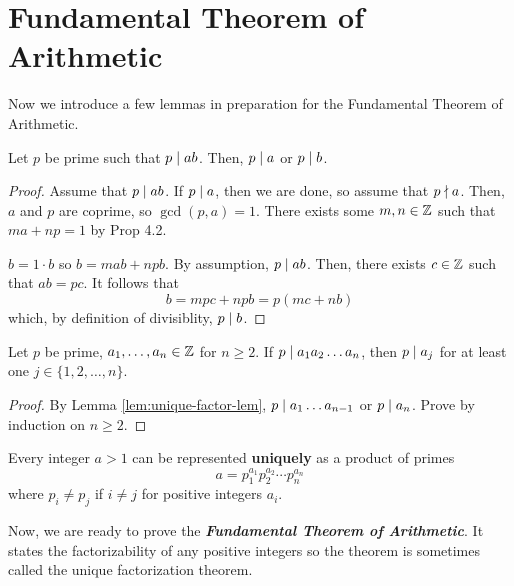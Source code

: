 \section{Fundamental Theorem of Arithmetic}

Now we introduce a few lemmas in preparation for the Fundamental Theorem of Arithmetic.

\begin{lemma} \label{lem:unique-factor-lem}
    Let $p$ be prime such that $p \mathrel{\mid} ab$. Then, $p \mathrel{\mid} a$ or $p \mathrel{\mid} b$.
\end{lemma}

\begin{proof}
    Assume that $p \mathrel{\mid} ab$. If $p \mathrel{\mid} a$, then we are done, so assume that $p \mathrel{\nmid} a$. Then, $a$ and $p$ are coprime, so $\gcd(p,a) = 1$. There exists some $m,n \in \mathbb{Z}$ such that $ma + np = 1$ by Prop 4.2.

    $b = 1 \cdot b$ so $b = mab + npb$. By assumption, $p \mathrel{\mid} ab$. Then, there exists $c \in \mathbb{Z}$ such that $ab = pc$. It follows that
    $$
    b = mpc + npb = p(mc+nb)
    $$
    which, by definition of divisiblity, $p \mathrel{\mid} b$.
\end{proof}

\begin{corollary} \label{cor:fta-cor}
    Let $p$ be prime, $a_1,\ldots,a_n \in \mathbb{Z}$ for $n \geq 2$. If $p \mathrel{\mid} a_1a_2\ldots a_n$, then $p \mathrel{\mid} a_j$ for at least one $j \in \{1,2,\ldots,n\}$.
\end{corollary}

\begin{proof}
    By Lemma \ref{lem:unique-factor-lem}, $p \mathrel{\mid} a_1\ldots a_{n-1}$ or $p \mathrel{\mid} a_n$. Prove by induction on $n \geq 2$.
\end{proof}

\begin{theorem}
    Every integer $a > 1$ can be represented \textbf{uniquely} as a product of primes
    $$
    a = p_1^{a_1} p_2^{a_2} \cdots p_n^{a_n}
    $$
    where $p_i \neq p_j$ if $i \neq j$ for positive integers $a_i$.
\end{theorem}

Now, we are ready to prove the \textit{\textbf{Fundamental Theorem of Arithmetic}}. It states the factorizability of any positive integers so the theorem is sometimes called the unique factorization theorem.

